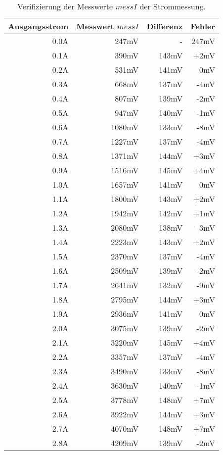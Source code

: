\begin{table}%
\centering
\begin{tabular}{|r|r|r|r|}
	\hline
	\textbf{Ausgangsstrom} & \textbf{Messwert $messI$} & \textbf{Differenz} & \textbf{Fehler} \\ \hline
	0.0A & 247mV & - & 247mV \\ \hline
	0.1A & 390mV & 143mV & +2mV \\ \hline
	0.2A & 531mV & 141mV & 0mV \\ \hline
	0.3A & 668mV & 137mV & -4mV \\ \hline
	0.4A & 807mV & 139mV & -2mV \\ \hline
	0.5A & 947mV & 140mV & -1mV \\ \hline
	0.6A & 1080mV & 133mV & -8mV \\ \hline
	0.7A & 1227mV & 137mV & -4mV \\ \hline
	0.8A & 1371mV & 144mV & +3mV \\ \hline
	0.9A & 1516mV & 145mV & +4mV \\ \hline
	1.0A & 1657mV & 141mV & 0mV \\ \hline
	1.1A & 1800mV & 143mV & +2mV \\ \hline
	1.2A & 1942mV & 142mV & +1mV \\ \hline
	1.3A & 2080mV & 138mV & -3mV \\ \hline
	1.4A & 2223mV & 143mV & +2mV \\ \hline
	1.5A & 2370mV & 137mV & -4mV \\ \hline
	1.6A & 2509mV & 139mV & -2mV \\ \hline
	1.7A & 2641mV & 132mV & -9mV \\ \hline
	1.8A & 2795mV & 144mV & +3mV \\ \hline
	1.9A & 2936mV & 141mV & 0mV \\ \hline
	2.0A & 3075mV & 139mV & -2mV \\ \hline
	2.1A & 3220mV & 145mV & +4mV \\ \hline
	2.2A & 3357mV & 137mV & -4mV \\ \hline
	2.3A & 3490mV & 133mV & -8mV \\ \hline
	2.4A & 3630mV & 140mV & -1mV \\ \hline
	2.5A & 3778mV & 148mV & +7mV \\ \hline
	2.6A & 3922mV & 144mV & +3mV \\ \hline
	2.7A & 4070mV & 148mV & +7mV \\ \hline
	2.8A & 4209mV & 139mV & -2mV \\ \hline
\end{tabular}
\caption{Verifizierung der Messwerte $messI$ der Strommessung.}
\label{tab:messI}
\end{table}
